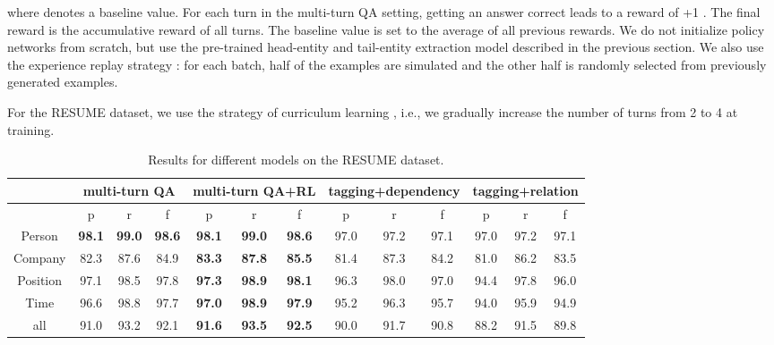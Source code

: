 \documentclass[11pt,a4paper]{article}
\begin{document}
where  denotes a baseline value.  
For each turn in the multi-turn QA setting, getting an answer correct leads to a reward of +1 . 
The final reward is the accumulative reward of all turns. 
The baseline value is set to the average of all previous rewards. 
We do not initialize policy networks from scratch, but use the pre-trained head-entity and tail-entity extraction model described in the previous section. 
We also use the experience replay strategy \cite{mnih2015human}: for each batch, half of the examples are simulated and the other half is randomly selected from previously generated examples. 

For the RESUME dataset, we use the strategy of curriculum learning \cite{bengio2009curriculum}, i.e., we gradually increase the number of turns from 2 to 4 at training. 

\begin{table*}
\center
\small
\begin{tabular}{|c|c|c|c|c|c|c|c|c|c|c|c|c|}\hline
& \multicolumn{3}{c|}{multi-turn QA} & \multicolumn{3}{c|}{multi-turn QA+RL} & \multicolumn{3}{c|}{tagging+dependency} & \multicolumn{3}{c|}{tagging+relation}\\\hline
& p & r & f& p & r & f & p & r & f & p & r & f\\\hline 
Person& {\bf98.1} & {\bf99.0} & {\bf98.6} & {\bf 98.1} & {\bf 99.0}  &{\bf98.6}         & 97.0&97.2& 97.1         & 97.0&97.2& 97.1\\
Company&82.3&87.6&84.9& {\bf 83.3} & {\bf 87.8} & {\bf 85.5}  & 81.4 &87.3 &   84.2            & 81.0&86.2 & 83.5\\
Position &97.1&98.5&97.8& {\bf 97.3} &{\bf 98.9}& {\bf 98.1} &    96.3 & 98.0 &     97.0       & 94.4 & 97.8&96.0\\
Time&96.6&98.8&97.7& {\bf 97.0} & {\bf 98.9}& {\bf 97.9}  &95.2 &96.3&     95.7               & 94.0& 95.9&94.9\\
all & 91.0&93.2&92.1&{\bf 91.6}&{\bf 93.5}&{\bf 92.5} &   90.0&91.7 &    90.8         &88.2&91.5 & 89.8\\\hline
\end{tabular}
\caption{Results for different models on the RESUME dataset.}
\label{resume-result}
\end{table*}
\end{document}
